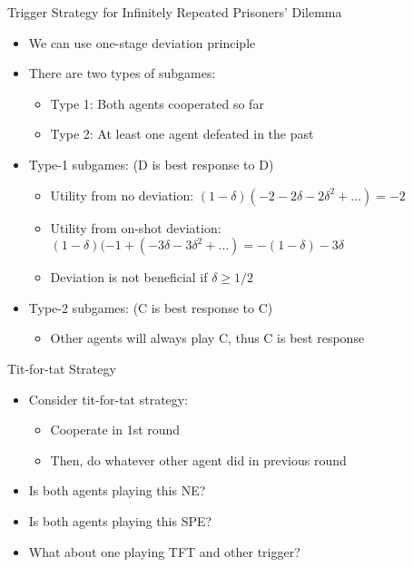 \documentclass[11pt,aspectratio=169]{beamer}
\begin{document}
  
  \begin{frame}{Trigger Strategy for Infinitely Repeated Prisoners' Dilemma}
   \begin{itemize}[<+->]
   \setlength{\itemsep}{0.7em}
    \item We can use one-stage deviation principle
    \item There are two types of subgames:
    \begin{itemize}[<.->]
     \item Type 1: Both agents cooperated so far
     \item Type 2: At least one agent defeated in the past
    \end{itemize}
    \item Type-1 subgames: (D is best response to D)
    \begin{itemize}
     \item Utility from no deviation: $(1 - \delta) (-2 - 2\delta - 2\delta^{2} + \dots) = - 2$
     \item Utility from on-shot deviation: $(1 - \delta) (-1 + (-3\delta -3\delta^{2} + \dots) = - (1 - \delta ) - 3\delta$
     \item Deviation is not beneficial if $\delta  \geq  1/2$
    \end{itemize}
    \item Type-2 subgames: (C is best response to C)
    \begin{itemize}
     \item Other agents will always play C, thus C is best response
    \end{itemize}  
   \end{itemize}
  \end{frame}    
    
  \begin{frame}{Tit-for-tat Strategy}
   \begin{itemize}[<+->]
   \setlength{\itemsep}{1.2em}
    \item Consider \alert{tit-for-tat} strategy:
    \begin{itemize}[<.->]
     \item Cooperate in 1st round
     \item Then, do whatever other agent did in previous round
    \end{itemize}
    \item Is both agents playing this NE?
    \item Is both agents playing this SPE?
    \item What about one playing TFT and other trigger?
   \end{itemize}
  \end{frame}
  
\end{document}
